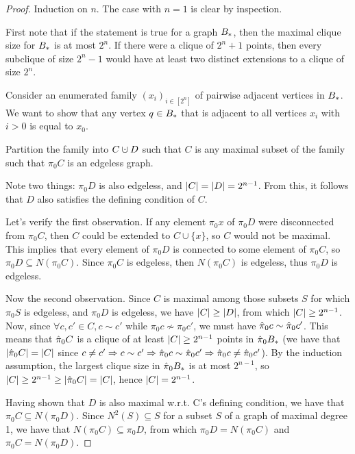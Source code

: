 \documentclass{amsart}
\theoremstyle{definition}
\newcommand{\cupdot}{\mathbin{\mathaccent\cdot\cup}}
\begin{document}
\begin{proof} 

  Induction on $n$. The case with $n=1$ is clear by inspection.

  First note that if the statement is true for a graph $B_*$, then the maximal clique size for $B_*$ is at most $2^n$. If there were a clique of $2^n+1$ points, then every subclique of size $2^n - 1$ would have at least two distinct extensions to a clique of size $2^n$.

  Consider an enumerated family $(x_i)_{i \in [2^n]}$ of pairwise adjacent
  vertices in $B_*$. We want to show that any vertex $q \in B_*$ that is
  adjacent to all vertices $x_i$ with $i > 0$ is equal to $x_0$.

  Partition the family into $C \cupdot D$ such that $C$ is any maximal
  subset of the family such that $\pi_0 C$ is an edgeless graph.

  Note two things: $\pi_0 D$ is also edgeless, and $\abs{C} = \abs{D} = 2^{n-1}$. From this, it follows that $D$ also satisfies the defining condition of $C$.

  Let's verify the first observation. If any element $\pi_0 x$ of $\pi_0 D$ were disconnected from $\pi_0 C$, then $C$ could be extended to $C \cup \{x\}$, so $C$ would not be maximal. This implies that every element of $\pi_0 D$ is connected to some element of $\pi_0 C$, so $\pi_0 D \subseteq N(\pi_0 C)$. Since $\pi_0 C$ is edgeless, then $N(\pi_0 C)$ is edgeless,
  thus $\pi_0 D$ is edgeless.

  Now the second observation. Since $C$ is maximal among those subsets $S$ for which $\pi_0 S$ is edgeless, and $\pi_0 D$ is edgeless, we have $\abs{C} \geq \abs{D}$, from which $\abs{C} \geq 2^{n-1}$. Now, since $\forall c, c' \in C, c \sim c'$ while $\pi_0 c \nsim \pi_0 c'$, we must have $\hat{\pi}_0 c \sim \hat{\pi}_0 c'$. This means that $\hat{\pi}_0 C$ is a clique of at least $\abs{C} \geq 2^{n-1}$ points in $\hat{\pi}_0 B_*$ (we have that $\abs{\hat{\pi}_0 C} = \abs{C}$ since $c \neq c' \Rightarrow c \sim c' \Rightarrow \hat{\pi}_0 c \sim \hat{\pi}_0 c' \Rightarrow \hat{\pi}_0 c \neq \hat{\pi}_0 c'$). By the induction assumption, the largest clique size in $\hat{\pi}_0 B_*$ is at most $2^{n-1}$, so $\abs{C} \geq 2^{n-1} \geq \abs{\hat{\pi}_0 C} = \abs{C}$, hence $\abs{C} = 2^{n-1}$.

  Having shown that $D$ is also maximal w.r.t. C's defining condition, we have that $\pi_0 C \subseteq N(\pi_0 D)$. Since $N^2(S) \subseteq S$ for a subset $S$ of a graph of maximal degree 1, we have that $N(\pi_0 C) \subseteq \pi_0 D$, from which $\pi_0 D = N(\pi_0 C)$ and $\pi_0 C = N(\pi_0 D)$.


\end{proof}
\end{document}
